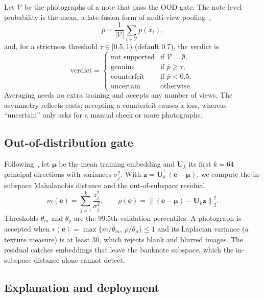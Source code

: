\documentclass[pdflatex,sn-mathphys-num]{sn-jnl}
\begin{document}
Let $\mathcal{V}$ be the photographs of a note that pass the OOD gate. The note-level
probability is the mean, a late-fusion form of multi-view pooling~\cite{su2015mvcnn},
\begin{equation}
\bar{p} = \frac{1}{|\mathcal{V}|}\sum_{i\in\mathcal{V}} p(x_i),
\label{eq:fusion}
\end{equation}
and, for a strictness threshold $\tau\in[0.5,1)$ (default 0.7), the verdict is
\begin{equation}
\text{verdict} =
\begin{cases}
\text{not supported} & \text{if } \mathcal{V}=\emptyset,\\
\text{genuine} & \text{if } \bar{p}\ge\tau,\\
\text{counterfeit} & \text{if } \bar{p}<0.5,\\
\text{uncertain} & \text{otherwise.}
\end{cases}
\label{eq:decision}
\end{equation}
Averaging needs no extra training and accepts any number of views. The asymmetry
reflects costs: accepting a counterfeit causes a loss, whereas ``uncertain'' only asks
for a manual check or more photographs.

\subsection{Out-of-distribution gate}\label{sec:ood}

Following~\cite{lee2018mahalanobis}, let $\boldsymbol{\mu}$ be the mean training
embedding and $\mathbf{U}_k$ its first $k=64$ principal directions with variances
$\sigma_j^2$. With $\mathbf{z}=\mathbf{U}_k^{\top}(\mathbf{e}-\boldsymbol{\mu})$, we
compute the in-subspace Mahalanobis distance and the out-of-subspace residual
\begin{equation}
m(\mathbf{e}) = \sum_{j=1}^{k}\frac{z_j^2}{\sigma_j^2},\qquad
\rho(\mathbf{e}) = \left\lVert(\mathbf{e}-\boldsymbol{\mu})-\mathbf{U}_k\mathbf{z}\right\rVert_2^2 .
\label{eq:ood}
\end{equation}
Thresholds $\theta_m$ and $\theta_\rho$ are the 99.5th validation percentiles. A
photograph is accepted when $r(\mathbf{e})=\max\{m/\theta_m,\ \rho/\theta_\rho\}\le1$
and its Laplacian variance (a texture measure) is at least 30, which rejects blank and
blurred images. The residual catches embeddings that leave the banknote subspace, which
the in-subspace distance alone cannot detect.

\subsection{Explanation and deployment}\label{sec:deploy}
\end{document}
